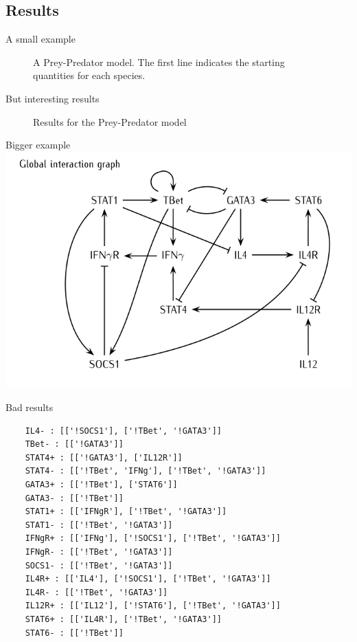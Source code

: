 \documentclass{beamer}
\begin{document}
\subsection{Results}
\begin{frame}{A small example}
	\begin{figure}[htbp]
		
		\caption{A Prey-Predator model. The first line indicates the starting quantities for each species. \label{preypred}}
	\end{figure}
\end{frame}
\begin{frame}{But interesting results}
	\begin{figure}
		\footnotesize{
		}
		\caption{Results for the Prey-Predator model\label{preypred_res}}
	\end{figure}
\end{frame}
\begin{frame}{Bigger example}
\centering
		\hspace{-3ex}\includegraphics[height=0.9\textheight]{th_net}
\end{frame}
\begin{frame}[fragile=singleslide]{Bad results}
\footnotesize
		\begin{verbatim}
	IL4- : [['!SOCS1'], ['!TBet', '!GATA3']]
	TBet- : [['!GATA3']]
	STAT4+ : [['!GATA3'], ['IL12R']]
	STAT4- : [['!TBet', 'IFNg'], ['!TBet', '!GATA3']]
	GATA3+ : [['!TBet'], ['STAT6']]
	GATA3- : [['!TBet']]
	STAT1+ : [['IFNgR'], ['!TBet', '!GATA3']]
	STAT1- : [['!TBet', '!GATA3']]
	IFNgR+ : [['IFNg'], ['!SOCS1'], ['!TBet', '!GATA3']]
	IFNgR- : [['!TBet', '!GATA3']]
	SOCS1- : [['!TBet', '!GATA3']]
	IL4R+ : [['IL4'], ['!SOCS1'], ['!TBet', '!GATA3']]
	IL4R- : [['!TBet', '!GATA3']]
	IL12R+ : [['IL12'], ['!STAT6'], ['!TBet', '!GATA3']]
	STAT6+ : [['IL4R'], ['!TBet', '!GATA3']]
	STAT6- : [['!TBet']]
	\end{verbatim}
\end{frame}
\end{document}
